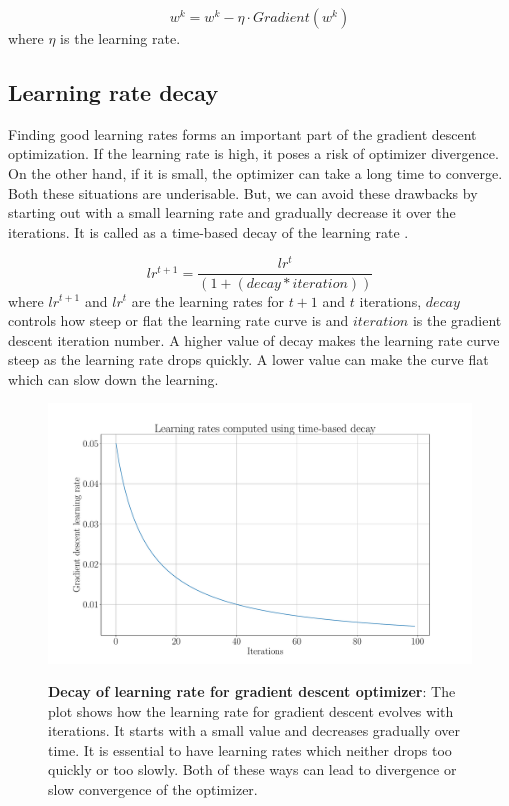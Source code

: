 \begin{equation}
w^k = w^k - \eta \cdot {Gradient(w^k)}
\end{equation}
where $\eta$ is the learning rate.

\subsection{Learning rate decay}
Finding good learning rates forms an important part of the gradient descent optimization. If the learning rate is high, it poses a risk of optimizer divergence. On the other hand, if it is small, the optimizer can take a long time to converge. Both these situations are underisable. But, we can avoid these drawbacks by starting out with a small learning rate and gradually decrease it over the iterations. It is called as a time-based decay of the learning rate \cite{articleRuderS}.

\begin{equation}
lr^{t+1} = \frac{lr^t}{( 1 + ( decay * iteration ) )}
\end{equation}
where $lr^{t+1}$ and $lr^t$ are the learning rates for $t+1$ and $t$ iterations, $decay$ controls how steep or flat the learning rate curve is and $iteration$ is the gradient descent iteration number. A higher value of decay makes the learning rate curve steep as the learning rate drops quickly. A lower value can make the curve flat which can slow down the learning.

\begin{figure}[h]
\begin{centering}
    {\includegraphics[scale=0.35]{figures/Learning_rates.pdf}}
    \caption[Decay of learning rate for gradient descent optimizer]{\textbf{Decay of learning rate for gradient descent optimizer}: The plot shows how the learning rate for gradient descent evolves with iterations. It starts with a small value and decreases gradually over time. It is essential to have learning rates which neither drops too quickly or too slowly. Both of these ways can lead to divergence or slow convergence of the optimizer.}
\end{centering}
\end{figure}

